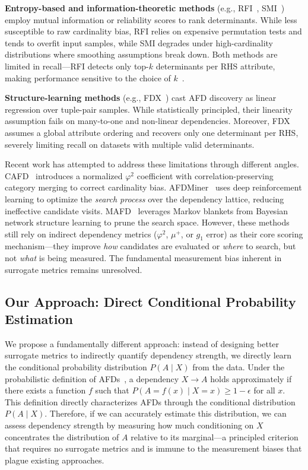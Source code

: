 \documentclass[conference]{IEEEtran}
\begin{document}
\textbf{Entropy-based and information-theoretic methods} (e.g., RFI~\cite{rfi}, SMI~\cite{smi}) employ mutual information or reliability scores to rank determinants. While less susceptible to raw cardinality bias, RFI relies on expensive permutation tests and tends to overfit input samples, while SMI degrades under high-cardinality distributions where smoothing assumptions break down. Both methods are limited in recall---RFI detects only top-$k$ determinants per RHS attribute, making performance sensitive to the choice of $k$~\cite{rfi}.

\textbf{Structure-learning methods} (e.g., FDX~\cite{fdx}) cast AFD discovery as linear regression over tuple-pair samples. While statistically principled, their linearity assumption fails on many-to-one and non-linear dependencies. Moreover, FDX assumes a global attribute ordering and recovers only one determinant per RHS, severely limiting recall on datasets with multiple valid determinants.

Recent work has attempted to address these limitations through different angles. CAFD~\cite{cafdui} introduces a normalized $\varphi^2$ coefficient with correlation-preserving category merging to correct cardinality bias. AFDMiner~\cite{afdminer} uses deep reinforcement learning to optimize the \emph{search process} over the dependency lattice, reducing ineffective candidate visits. MAFD~\cite{mafd} leverages Markov blankets from Bayesian network structure learning to prune the search space. However, these methods still rely on indirect dependency metrics ($\varphi^2$, $\mu^+$, or $g_1$ error) as their core scoring mechanism---they improve \emph{how} candidates are evaluated or \emph{where} to search, but not \emph{what} is being measured. The fundamental measurement bias inherent in surrogate metrics remains unresolved.

\subsection*{Our Approach: Direct Conditional Probability Estimation}

We propose a fundamentally different approach: instead of designing better surrogate metrics to indirectly quantify dependency strength, we directly learn the conditional probability distribution $P(A \mid X)$ from the data. Under the probabilistic definition of AFDs~\cite{pyro,measure_study}, a dependency $X \to A$ holds approximately if there exists a function $f$ such that $P(A = f(x) \mid X = x) \geq 1 - \epsilon$ for all $x$. This definition directly characterizes AFDs through the conditional distribution $P(A \mid X)$. Therefore, if we can accurately estimate this distribution, we can assess dependency strength by measuring how much conditioning on $X$ concentrates the distribution of $A$ relative to its marginal---a principled criterion that requires no surrogate metrics and is immune to the measurement biases that plague existing approaches.
\end{document}
